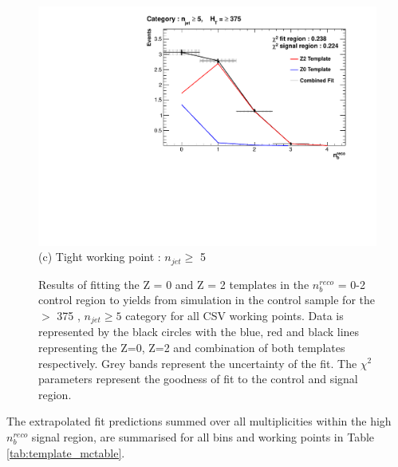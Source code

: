 \begin{figure}[ht]
\footnotesize
\centering
\begin{minipage}[b]{0.51\linewidth}
\centering
\includegraphics[width = 1.0\linewidth]{plots/ThesisPlots/Final_Fit_To_MC_Normal_Tight_HTBin_OneMuon_Template_375_jet_mult_5.pdf}
\centering (c) Tight working point : $n_{jet} \geq$ 5 
\end{minipage}
\caption[Results of fitting the Z = 0 and Z = 2 templates in the $n_{b}^{reco}$ = 0-2 control region to yields from simulation in the \mupjets control sample for the \theht $>$ 375 \GeV, $n_{jet} \geq 5$ category for all \ac{CSV} working points.]{Results of fitting the Z = 0 and Z = 2 templates in the $n_{b}^{reco}$ = 0-2 control region to yields from simulation in the \mupjets control sample for the \theht $>$ 375 \GeV, $n_{jet} \geq 5$ category  for all \ac{CSV} working points. Data is represented by the black circles with the blue, red and black lines representing the Z=0, Z=2 and combination of both templates respectively. Grey bands represent the uncertainty of the fit. The $\chi^{2}$ parameters represent the goodness of fit to the control and signal region.}
\label{fig:template_closure_njet5}
\end{figure}
\FloatBarrier

The extrapolated fit predictions summed over all \njet multiplicities within the high $n_{b}^{reco}$ signal region, are summarised for all \theht bins and working points in Table \ref{tab:template_mctable}. 

